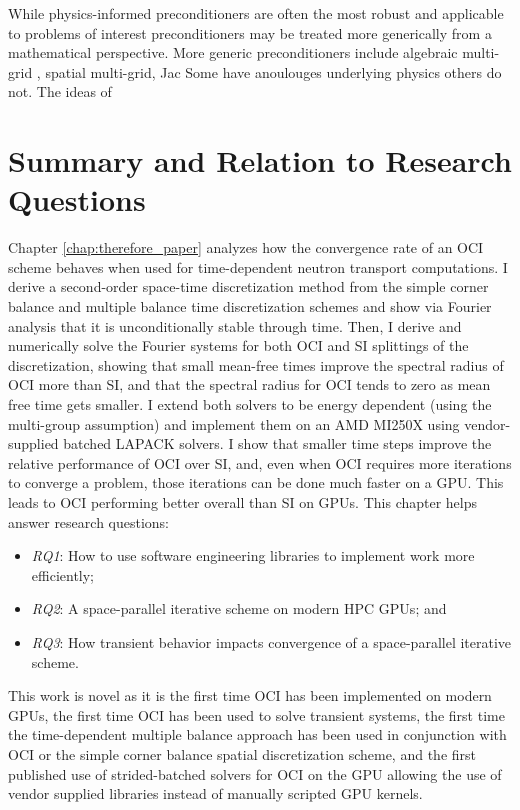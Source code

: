 While physics-informed preconditioners are often the most robust and applicable to problems of interest preconditioners may be treated more generically from a mathematical perspective.
More generic preconditioners include algebraic multi-grid \cite{southworth_phd}, spatial multi-grid, Jac
Some have anoulouges underlying physics others do not.
The ideas of 


\section{Summary and Relation to Research Questions}

Chapter \ref{chap:therefore_paper} analyzes how the convergence rate of an OCI scheme behaves when used for time-dependent neutron transport computations.
I derive a second-order space-time discretization method from the simple corner balance and multiple balance time discretization schemes and show via Fourier analysis that it is unconditionally stable through time.
Then, I derive and numerically solve the Fourier systems for both OCI and SI splittings of the discretization, showing that small mean-free times improve the spectral radius of OCI more than SI, and that the spectral radius for OCI tends to zero as mean free time gets smaller.
I extend both solvers to be energy dependent (using the multi-group assumption) and implement them on an AMD MI250X using vendor-supplied batched LAPACK solvers.
I show that smaller time steps improve the relative performance of OCI over SI, and, even when OCI requires more iterations to converge a problem, those iterations can be done much faster on a GPU.
This leads to OCI performing better overall than SI on GPUs.
This chapter helps answer research questions:
\begin{itemize}
    \item \emph{RQ1}: How to use software engineering libraries to implement work more efficiently;
    \item \emph{RQ2}: A space-parallel iterative scheme on modern HPC GPUs; and
    \item \emph{RQ3}: How transient behavior impacts convergence of a space-parallel iterative scheme.
\end{itemize}
This work is novel as it is the first time OCI has been implemented on modern GPUs, the first time OCI has been used to solve transient systems, the first time the time-dependent multiple balance approach has been used in conjunction with OCI or the simple corner balance spatial discretization scheme, and the first published use of strided-batched solvers for OCI on the GPU allowing the use of vendor supplied libraries instead of manually scripted GPU kernels.

